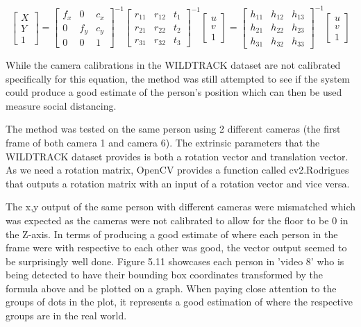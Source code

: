 \documentclass[12pt]{report}
\begin{document}
\begin{equation*}
\begin{bmatrix}
X \\
Y \\
1
\end{bmatrix}
=
\begin{bmatrix}
f_{x} & 0 & c_{x} \\
0 & f_{y} & c_{y} \\
0 & 0 & 1
\end{bmatrix}
^{-1}
\begin{bmatrix}
r_{11} & r_{12} & t_{1}\\
r_{21} & r_{22} & t_{2}\\
r_{31} & r_{32} & t_{3}
\end{bmatrix}
^{-1}
\begin{bmatrix}
u \\
v \\
1
\end{bmatrix}
=
\begin{bmatrix}
h_{11} & h_{12} & h_{13}\\
h_{21} & h_{22} & h_{23}\\
h_{31} & h_{32} & h_{33}
\end{bmatrix}
^{-1}
\begin{bmatrix}
u \\
v \\
1
\end{bmatrix}
\end{equation*}

While the camera calibrations in the WILDTRACK dataset are not calibrated specifically for this equation, the method was still attempted to see if the system could produce a good estimate of the person's position which can then be used measure social distancing.

\vspace{2mm}

The method was tested on the same person using 2 different cameras (the first frame of both camera 1 and camera 6). The extrinsic parameters that the WILDTRACK dataset provides is both a rotation vector and translation vector. As we need a rotation matrix, OpenCV provides a function called cv2.Rodrigues that outputs a rotation matrix with an input of a rotation vector and vice versa.

\vspace{2mm}

The x,y output of the same person with different cameras were mismatched which was expected as the cameras were not calibrated to allow for the floor to be 0 in the Z-axis. In terms of producing a good estimate of where each person in the frame were with respective to each other was good, the vector output seemed to be surprisingly well done. Figure 5.11 showcases each person in 'video 8'  who is being detected to have their bounding box coordinates transformed by the formula above and be plotted on a graph. When paying close attention to the groups of dots in the plot, it represents a good estimation of where the respective groups are in the real world.
\end{document}

